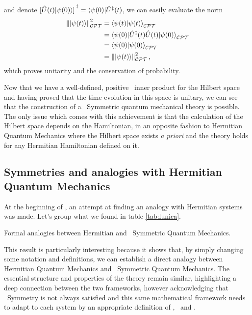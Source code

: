             and denote $\bqty*{\hU\pqty{t}\!\ket{\psi\pqty{0}}}^\myconj = \bra{\psi\pqty{0}}\!\hU^\myconj\pqty{t}$, we can easily evaluate the norm
            \begin{align*}
                \norm{\ket{\psi\pqty{t}}}^2_{\CPT}
                &= \braket{\psi{\pqty{t}}}{\psi\pqty{t}}_{\CPT} \\
                &= \bra{\psi\pqty{0}}\! \hU^\myconj\pqty{t} \hU\pqty{t} \!\ket{\psi\pqty{0}}_{\CPT} \\
                &= \bra{\psi\pqty{0}}\ket{\psi\pqty{0}}_{\CPT} \\
                &= \norm{\ket{\psi\pqty{t}}}^2_{\CPT}
                \mycomma
            \end{align*}
            which proves unitarity and the conservation of probability.

            Now that we have a well-defined, positive \CPT\ inner product for the Hilbert space and having proved that the time evolution in this space is unitary, we can see that the construction of a \PT\ Symmetric quantum mechanical theory is possible. The only issue which comes with this achievement is that the calculation of the Hilbert space depends on the Hamiltonian, in an opposite fashion to Hermitian Quantum Mechanics where the Hilbert space exists \emph{a priori} and the theory holds for any Hermitian Hamiltonian defined on it.

        \subsection{Symmetries and analogies with Hermitian Quantum Mechanics}
            At the beginning of , an attempt at finding an analogy with Hermitian systems was made. Let's group what we found in table \ref{tab:lunica}.
            \begin{table}[h]
                \centering
                \label{tab:lunica}
                
                \caption{Formal analogies between Hermitian and \PT\ Symmetric Quantum Mechanics.}
            \end{table}
            
            This result is particularly interesting because it shows that, by simply changing some notation and definitions, we can establish a direct analogy between Hermitian Quantum Mechanics and \PT\ Symmetric Quantum Mechanics. The essential structure and properties of the theory remain similar, highlighting a deep connection between the two frameworks, however acknowledging that \PT\ Symmetry is not always satisfied and this same mathematical framework needs to adapt to each system by an appropriate definition of \hC, \hP\ and \hT.
           
